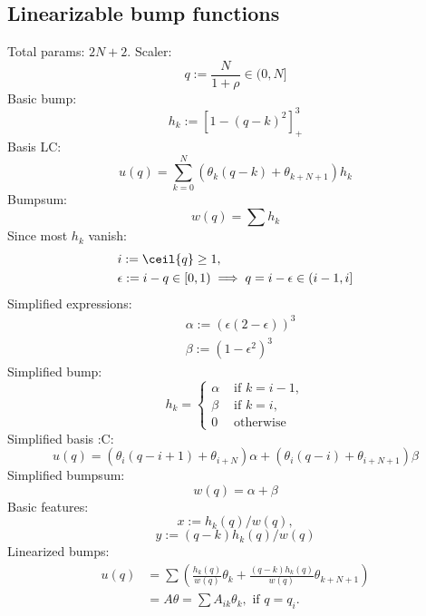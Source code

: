 \documentclass[12pt]{article}
\begin{document}
\subsection{Linearizable bump functions}
Total params: $2N+2$.
Scaler:
\begin{equation}
    q := \frac{N}{1+\rho} \in (0,N]
\end{equation}
Basic bump:
\begin{equation}
    h_k := [1-(q-k)^2]^3_+
\end{equation}
Basis LC:
\begin{equation}
    u(q) = \sum_{k=0}^N(\theta_k (q-k) + \theta_{k+N+1})h_k
\end{equation}
Bumpsum:
\begin{equation}
    w(q) = \sum h_k
\end{equation}
Since most $h_k$ vanish:
\begin{equation}
    \begin{split}
        & i := \ceil{q} \geq 1, \\
        & \epsilon := i-q \in [0,1) \implies q = i - \epsilon \in (i-1,i]
    \end{split}
\end{equation}
Simplified expressions:
\begin{equation}
    \begin{split}
        & \alpha := (\epsilon(2-\epsilon))^3 \\
        & \beta := (1-\epsilon^2)^3
    \end{split}
\end{equation}
Simplified bump:
\begin{equation}
    h_k = 
    \begin{cases}
        \alpha & \text{ if }k=i-1, \\
        \beta & \text{ if }k=i, \\
        0 & \text{ otherwise }
    \end{cases}
\end{equation}
Simplified basis :C:
\begin{equation}
    u(q) = (\theta_i(q-i+1) + \theta_{i+N})\alpha + (\theta_i(q-i) + \theta_{i+N+1})\beta
\end{equation}
Simplified bumpsum:
\begin{equation}
    w(q) = \alpha + \beta
\end{equation}
Basic features:
\begin{equation}
    x := h_k(q)/w(q),
\end{equation}
\begin{equation}
    y := (q-k)h_k(q)/w(q)
\end{equation}
Linearized bumps:
\begin{equation}
    \begin{split}
        u(q) & = \sum \left(\frac{h_k(q)}{w(q)}\theta_k + \frac{(q-k)h_k(q)}{w(q)}\theta_{k+N+1}\right) \\
        & = A\theta = \sum A_{ik}\theta_k, \text{ if }q=q_i.
    \end{split}
\end{equation}
\end{document}
